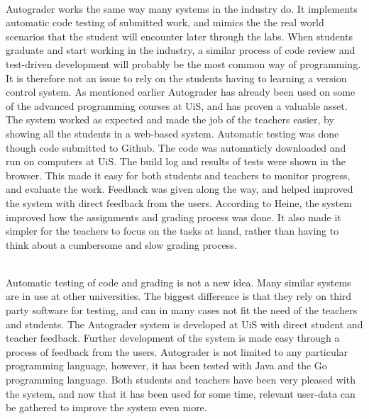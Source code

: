 \\Autograder works the same way many systems in the industry do. It implements automatic code testing of submitted work, and mimics the the real world scenarios that the student will encounter later through the labs. When students graduate and start working in the industry, a similar process of code review and test-driven development will probably be the most common way of programming. It is therefore not an issue to rely on the students having to learning a version control system. As mentioned earlier Autograder has already been used on some of the advanced programming courses at UiS, and has proven a valuable asset. The system worked as expected and made the job of the teachers easier, by showing all the students in a web-based system. Automatic testing was done though code submitted to Github. The code was automaticly downloaded and run on computers at UiS. The build log and results of tests were shown in the  browser. This made it easy for both students and teachers to monitor progress, and evaluate the work. Feedback was given along the way, and helped improved the system with direct feedback from the users. According to Heine, the system improved how the assignments and grading process was done. It also made it simpler for the teachers to focus on the tasks at hand, rather than having to think about a cumbersome and slow grading process.

\\Automatic testing of code and grading is not a new idea. Many similar systems are in use at other universities. The biggest difference is that they rely on third party software for testing, and can in many cases not fit the need of the teachers and students. The Autograder system is developed at UiS with direct student and teacher feedback. Further development of the system is made easy through a process of feedback from the users. Autograder is not limited to any particular programming language, however, it has been tested with Java and the Go programming language. Both students and teachers have been very pleased with the system, and now that it has been used for some time, relevant user-data can be gathered to improve the system even more.

